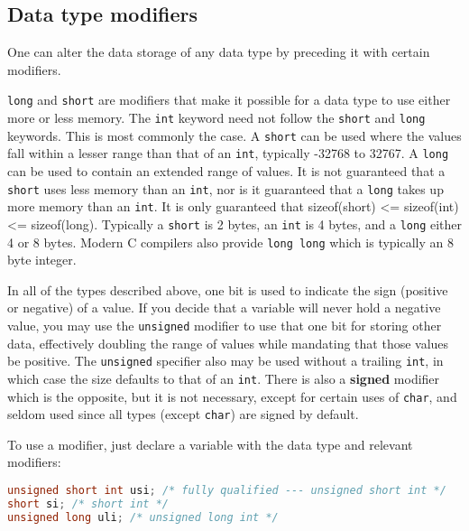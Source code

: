 \subsection{Data type modifiers}
One can alter the data storage of any data type by preceding it with certain
modifiers.

\texttt{long} and \texttt{short} are modifiers that make it possible for a data
type to use either more or less memory. The \texttt{int} keyword need not
follow the \texttt{short} and \texttt{long} keywords. This is most commonly the
case. A \texttt{short} can be used where the values fall within a lesser range
than that of an \texttt{int}, typically -32768 to 32767. A \texttt{long} can be
used to contain an extended range of values. It is not guaranteed that a
\texttt{short} uses less memory than an \texttt{int}, nor is it guaranteed that
a \texttt{long} takes up more memory than an \texttt{int}. It is only
guaranteed that sizeof(short) \textless{}= sizeof(int) \textless{}=
sizeof(long). Typically a \texttt{short} is 2 bytes, an \texttt{int} is 4
bytes, and a \texttt{long} either 4 or 8 bytes. Modern C compilers also provide
\texttt{long long} which is
typically an 8 byte integer. 

In all of the types described above, one bit is used to indicate the sign
(positive or negative) of a value. If you decide that a variable will never
hold a negative value, you may use the \texttt{unsigned} modifier to use that
one bit for storing other data, effectively doubling the range of values while
mandating that those values be positive. The \texttt{unsigned} specifier also
may be used without a trailing \texttt{int}, in which case the size defaults to
that of an \texttt{int}. There is also a \textbf{signed} modifier which is the
opposite, but it is not necessary, except for certain uses of \texttt{char},
and seldom used since all types (except \texttt{char}) are signed by default.

To use a modifier, just declare a variable with the data type and relevant modifiers:
\lstset{basicstyle=\scriptsize, numbers=left, captionpos=b, tabsize=4}
\begin{lstlisting}[caption=Section \thesection listing \arabic{varcnt},language={C},
breaklines=true,xleftmargin=15pt,label=lst:section\thesection listing\arabic{varcnt}]
unsigned short int usi; /* fully qualified --- unsigned short int */
short si; /* short int */
unsigned long uli; /* unsigned long int */
\end{lstlisting}

